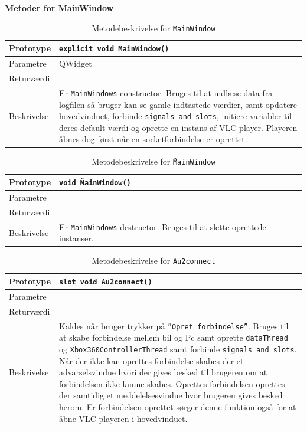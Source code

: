 \textbf{Metoder for MainWindow}

\begin{table}[H]
\begin{tabularx}{\textwidth}{| L{2.5 cm} | Z |} \hline
Prototype & \texttt{explicit void MainWindow()} \\\hline
Parametre &  QWidget \\\hline
Returværdi &  \\\hline
Beskrivelse & Er \texttt{MainWindows} constructor. Bruges til at indlæse data fra logfilen så bruger kan se gamle indtastede værdier, samt opdatere hovedvinduet, forbinde \texttt{signals and slots}, initiere variabler til deres default værdi og oprette en instans af VLC player. Playeren åbnes dog først når en socketforbindelse er oprettet.   \\\hline
\end{tabularx}
\caption{Metodebeskrivelse for \texttt{MainWindow}}
\label{table:met_MainWindow}
\end{table}

\begin{table}[H]
\begin{tabularx}{\textwidth}{| L{2.5 cm} | Z |} \hline
Prototype & \texttt{void \~MainWindow()} \\\hline
Parametre &  \\\hline
Returværdi &  \\\hline
Beskrivelse & Er \texttt{MainWindows} destructor. Bruges til at slette oprettede instanser. \\\hline
\end{tabularx}
\caption{Metodebeskrivelse for \texttt{\~MainWindow}}
\label{table:met_sMainWindow}
\end{table}


\begin{table}[H]
\begin{tabularx}{\textwidth}{| L{2.5 cm} | Z |} \hline
Prototype & \texttt{slot void Au2connect()} \\\hline
Parametre &   \\\hline
Returværdi &  \\\hline
Beskrivelse & Kaldes når bruger trykker på \texttt{''Opret forbindelse''}. Bruges til at skabe forbindelse mellem bil og Pc samt oprette \texttt{dataThread} og \texttt{Xbox360ControllerThread} samt forbinde \texttt{signals and slots}. Når der ikke kan oprettes forbindelse skabes der et advarselsvindue hvori der gives besked til brugeren om at forbindelsen ikke kunne skabes. Oprettes forbindelsen oprettes der samtidig et meddelelsesvindue hvor brugeren gives besked herom. Er forbindelsen oprettet sørger denne funktion også for at åbne VLC-playeren i hovedvinduet. \\\hline
\end{tabularx}
\caption{Metodebeskrivelse for \texttt{Au2connect}}
\label{table:met_Au2connect}
\end{table}

